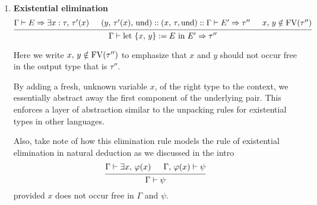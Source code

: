 \documentclass{article}
\begin{document}
\begin{enumerate}
\item \textbf{Existential elimination} \\
\[
  \begin{prooftree}
   \hypo{\Gamma \vdash E \Rightarrow \exists x : \tau, \, \tau'(x)} 
   \hypo{(y, \, \tau'(x), \, \text{und}) :: (x, \, \tau, \text{und}) :: \Gamma \vdash
          E' \Rightarrow \tau''}
   \hypo{x, \, y \notin \FV(\tau'')}
   \infer3{\Gamma \vdash \text{let } \{x, \, y\} := E \text{ in } E' \Rightarrow \tau''}
  \end{prooftree}
\]

Here we write $x, \, y \notin \operatorname{FV}(\tau'')$ to emphasize that $x$ and $y$ 
should not occur free in the output type that is $\tau''$.

By adding a fresh, unknown variable $x$, of the right type to the context, we
essentially abstract away the first component of the underlying pair.
This enforces a layer of abstraction similar to the unpacking rules for
existential types in other languages.

Also, take note of how this elimination rule models the rule 
of existential elimination in natural deduction as we discussed in the intro
\[
\begin{prooftree}
  \hypo{\Gamma \vdash \exists x, \, \varphi(x)}
  \hypo{\Gamma, \, \varphi(x) \vdash \psi}
  \infer2{\Gamma \vdash \psi}
\end{prooftree}
\]
provided $x$ does not occur free in $\Gamma$ and $\psi$.




\end{enumerate}
\end{document}
